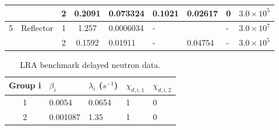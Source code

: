 \begin{table}[!htbp]
{\begin{tabular}{|c|c|c|c|l|l|l|l|l|}
             &                    & 2    & 0.2091     & 0.073324       & 0.1021            & 0.02617                     & 0        & $3.0\times10^5$    \\
      \hline
      5      & Reflector        & 1      & 1.257      & 0.0006034      & -                 &                             & -        & $3.0\times10^7$    \\
             &                  & 2      & 0.1592     & 0.01911        & -                 & 0.04754                     & -        & $3.0\times10^5$    \\
      \hline
      \end{tabular}}
\end{table}

\begin{table}[!htbp]
    \centering
    \caption{LRA benchmark delayed neutron data.\label{tab:lra-dnp}}
      \begin{tabular}{|c|l|l|l|l|}
      \hline
      Group i & $\beta_i$ & $\lambda_i$ ($s^{-1}$) & $\chi_{d,i,1}$ & $\chi_{d,i,2}$ \\
      \hline
      1       & 0.0054    & 0.0654  & 1 & 0 \\
      2       & 0.001087  & 1.35    & 1 & 0 \\
      \hline
      \end{tabular}
\end{table}

